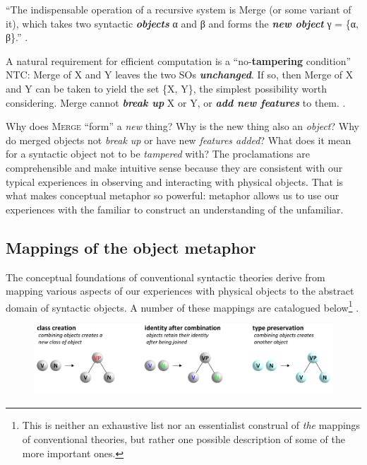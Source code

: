 “The indispensable operation of a recursive system is Merge (or some variant of it), which takes two syntactic \textbf{\textit{objects}} α and β and forms the \textbf{\textit{new object}} γ = \{α, β\}.” \citep[3]{Chomsky2001}.

A natural requirement for efficient computation is a “no-\textbf{tampering} condition” NTC: Merge of X and Y leaves the two SOs \textbf{\textit{unchanged}}. If so, then Merge of X and Y can be taken to yield the set \{X, Y\}, the simplest possibility worth considering. Merge cannot \textbf{\textit{break up}} X or Y, or \textbf{\textit{add new features}} to them. \citep[5-6]{Chomsky2008}.

  Why does \textsc{Merge} “form” a \textit{new} thing? Why is the new thing also an \textit{object}? Why do merged objects not \textit{break up} or have new \textit{features added}? What does it mean for a syntactic object not to be \textit{tampered} with? The proclamations are comprehensible and make intuitive sense because they are consistent with our typical experiences in observing and interacting with physical objects. That is what makes conceptual metaphor so powerful: metaphor allows us to use our experiences with the familiar to construct an understanding of the unfamiliar. 

\subsection{Mappings of the object metaphor}

The conceptual foundations of conventional syntactic theories derive from mapping various aspects of our experiences with physical objects to the abstract domain of syntactic objects. A number of these mappings are catalogued below\footnote{This is neither an exhaustive list nor an essentialist construal of \textit{the} mappings of conventional theories, but rather one possible description of some of the more important ones.} .

  
\begin{figure}
\includegraphics[width=\textwidth]{figures/Tilsen-img29.png}
\caption{\missingcaption}
\label{fig:3:1}
\end{figure}
 

